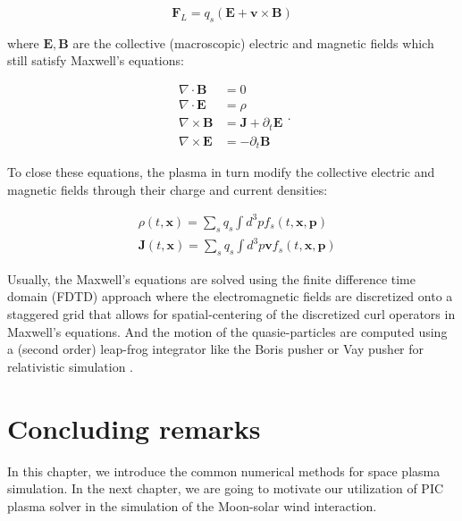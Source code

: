 $$\mathbf{F}_{L}=q_{s}(\mathbf{E}+\mathbf{v} \times \mathbf{B})$$

where $\mathbf{E}, \mathbf{B}$ are the collective (macroscopic) electric and magnetic fields which still satisfy Maxwell's equations:

$$\begin{aligned} \nabla \cdot \mathbf{B} &=0 \\ \nabla \cdot \mathbf{E} &=\rho \\ \nabla \times \mathbf{B} &=\mathbf{J}+\partial_{t} \mathbf{E} \\ \nabla \times \mathbf{E} &=-\partial_{t} \mathbf{B} \end{aligned}.$$

To close these equations, the plasma in turn modify the collective electric and magnetic fields through their charge and current densities:

$$\begin{aligned} &\rho(t, \mathbf{x})=\sum_{s} q_{s} \int d^{3} p f_{s}(t, \mathbf{x}, \mathbf{p}) \\ &\mathbf{J}(t, \mathbf{x})=\sum_{s} q_{s} \int d^{3} p \mathbf{v} f_{s}(t, \mathbf{x}, \mathbf{p}) \end{aligned} $$

Usually, the Maxwell's equations are solved using the finite difference time domain (FDTD) approach \citep{tafloveComputationalElectromagneticsFiniteDifference2005} where the electromagnetic fields are discretized onto a staggered grid that allows for spatial-centering of the discretized curl operators in Maxwell's equations. And the motion of the quasie-particles are  computed using a (second order) leap-frog integrator like the Boris pusher or Vay pusher for relativistic simulation \citep{vaySimulationBeamsPlasmas2008}.


\section{Concluding remarks}


In this chapter, we introduce the common numerical methods for space plasma simulation. In the next chapter, we are going to motivate our utilization of PIC plasma solver in the simulation of the Moon-solar wind interaction.